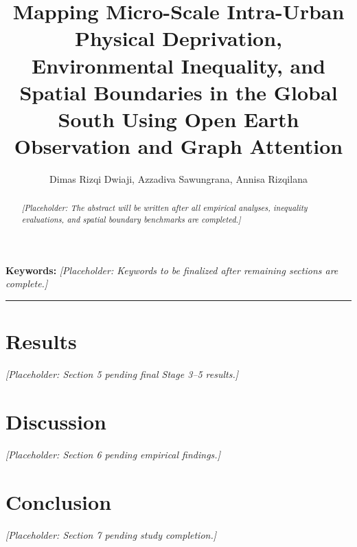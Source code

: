 \documentclass[11pt,a4paper]{article}
\title{Mapping Micro-Scale Intra-Urban Physical Deprivation, Environmental Inequality, and Spatial Boundaries in the Global South Using Open Earth Observation and Graph Attention}
\author{Dimas Rizqi Dwiaji, Azzadiva Sawungrana, Annisa Rizqilana}
\date{}
\begin{document}
\maketitle

\begin{abstract}
\noindent\textit{[Placeholder: The abstract will be written after all empirical analyses, inequality evaluations, and spatial boundary benchmarks are completed.]}
\end{abstract}

\noindent\textbf{Keywords:} \textit{[Placeholder: Keywords to be finalized after remaining sections are complete.]}

\vspace{1em}
\hrule
\vspace{1.5em}






\section{Results}
\noindent\textit{[Placeholder: Section 5 pending final Stage 3--5 results.]}

\section{Discussion}
\noindent\textit{[Placeholder: Section 6 pending empirical findings.]}

\section{Conclusion}
\noindent\textit{[Placeholder: Section 7 pending study completion.]}

\newpage


\end{document}
